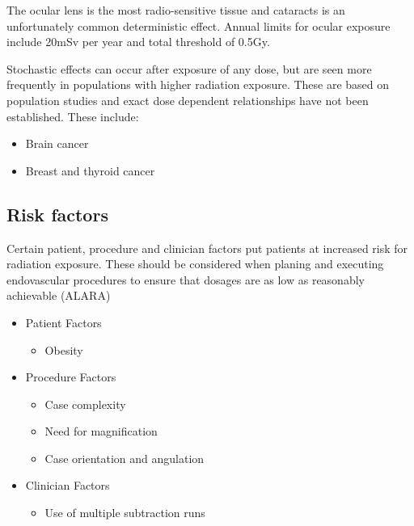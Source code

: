 \documentclass[
]{book}
\providecommand{\tightlist}{%
  \setlength{\itemsep}{0pt}\setlength{\parskip}{0pt}}
\begin{document}
The ocular lens is the most radio-sensitive tissue and cataracts is an
unfortunately common deterministic effect.\citep{machan2018, brown2011}
Annual limits for ocular exposure include 20mSv per year and total
threshold of 0.5Gy.

Stochastic effects can occur after exposure of any dose, but are seen
more frequently in populations with higher radiation exposure. These are
based on population studies and exact dose dependent relationships have
not been established. These include:

\begin{itemize}
\item
  Brain cancer\citep{rajaraman2016, kirkwood2018}
\item
  Breast and thyroid cancer\citep{johnson2001, einstein2012}
\end{itemize}

\hypertarget{risk-factors}{%
\subsection{Risk factors}\label{risk-factors}}

Certain patient, procedure and clinician factors put patients at
increased risk for radiation exposure.\citep{killewich2011, mitchell2011}
These should be considered when planing and executing endovascular
procedures to ensure that dosages are as low as reasonably achievable
(ALARA)

\begin{itemize}
\item
  Patient Factors

  \begin{itemize}
  \tightlist
  \item
    Obesity
  \end{itemize}
\item
  Procedure Factors

  \begin{itemize}
  \item
    Case complexity
  \item
    Need for magnification
  \item
    Case orientation and angulation
  \end{itemize}
\item
  Clinician Factors

  \begin{itemize}
  \tightlist
  \item
    Use of multiple subtraction runs
  \end{itemize}
\end{itemize}
\end{document}
